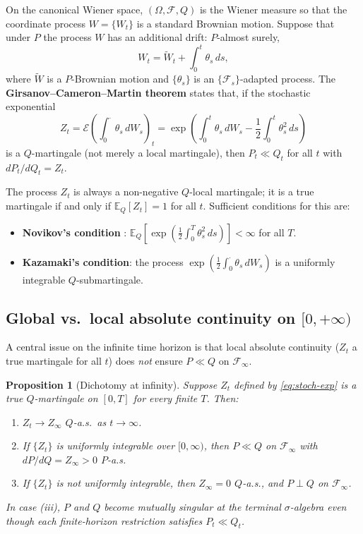 \documentclass[12pt]{article}
\newtheorem{proposition}[theorem]{Proposition}
\newcommand{\E}{\mathbb{E}}
\begin{document}
On the canonical Wiener space, $(\Omega, \mathscr{F}, Q)$ is the Wiener
measure so that the coordinate process $W = \{W_t\}$ is a standard
Brownian motion.  Suppose that under $P$ the process $W$ has an additional
drift: $P$-almost surely,
\[
W_t = \widetilde{W}_t + \int_0^t \theta_s\, ds,
\]
where $\widetilde{W}$ is a $P$-Brownian motion and $\{\theta_s\}$ is an
$\{\mathscr{F}_s\}$-adapted process.  The \textbf{Girsanov--Cameron--Martin
theorem} \citep{girsanov1960} states that, if the stochastic exponential
\begin{equation}
\label{eq:stoch-exp}
Z_t = \mathcal{E}\!\left(\int_0^\cdot \theta_s\, dW_s\right)_t
= \exp\!\left(\int_0^t \theta_s\, dW_s - \frac{1}{2}\int_0^t \theta_s^2\, ds\right)
\end{equation}
is a $Q$-martingale (not merely a local martingale), then $P_t \ll Q_t$ for
all $t$ with $dP_t/dQ_t = Z_t$.

The process $Z_t$ is always a non-negative $Q$-local martingale; it is a
true martingale if and only if $\E_Q[Z_t] = 1$ for all $t$.  Sufficient
conditions for this are:

\begin{itemize}
\item \textbf{Novikov's condition} \citep{novikov1972}: $\E_Q\!\left[\exp\!\left(\tfrac{1}{2}\int_0^T \theta_s^2\, ds\right)\right] < \infty$ for all $T$.
\item \textbf{Kazamaki's condition}: the process $\exp\!\left(\tfrac{1}{2}\int_0^\cdot \theta_s\, dW_s\right)$ is a uniformly integrable $Q$-submartingale.
\end{itemize}

\subsection{Global vs.\ local absolute continuity on $[0,+\infty)$}

A central issue on the infinite time horizon is that local absolute
continuity ($Z_t$ a true martingale for all $t$) does \emph{not} ensure
$P \ll Q$ on $\mathscr{F}_\infty$.

\begin{proposition}[Dichotomy at infinity]
\label{prop:dichotomy}
Suppose $Z_t$ defined by \eqref{eq:stoch-exp} is a true $Q$-martingale on
$[0, T]$ for every finite $T$.  Then:
\begin{enumerate}[label=(\roman*)]
\item $Z_t \to Z_\infty$ $Q$-a.s.\ as $t \to \infty$.
\item If $\{Z_t\}$ is uniformly integrable over $[0,\infty)$, then
      $P \ll Q$ on $\mathscr{F}_\infty$ with $dP/dQ = Z_\infty > 0$
      $P$-a.s.
\item If $\{Z_t\}$ is \emph{not} uniformly integrable, then $Z_\infty = 0$
      $Q$-a.s., and $P \perp Q$ on $\mathscr{F}_\infty$.
\end{enumerate}
In case (iii), $P$ and $Q$ become mutually singular at the terminal
$\sigma$-algebra even though each finite-horizon restriction satisfies
$P_t \ll Q_t$.
\end{proposition}
\end{document}
